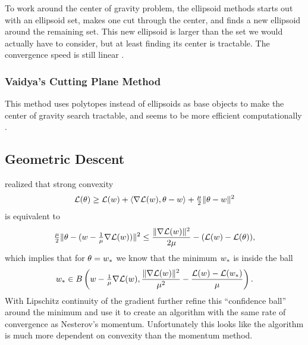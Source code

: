 To work around the center of gravity problem, the ellipsoid methods starts out
with an ellipsoid set, makes one cut through the center, and finds a new
ellipsoid around the remaining set. This new ellipsoid is larger than the
set we would actually have to consider, but at least finding its center is
tractable. The convergence speed is still linear \parencite[e.g][Theorem
2.4]{bubeckConvexOptimizationAlgorithms2015}.


\subsubsection{Vaidya's Cutting Plane Method}

This method uses polytopes instead of ellipsoids as base objects to make the
center of gravity search tractable, and seems to be more efficient
computationally \parencite[e.g.][Section
2.3]{bubeckConvexOptimizationAlgorithms2015}.

\subsection{Geometric Descent}

\textcite{bubeckGeometricAlternativeNesterov2015} realized that strong convexity
\begin{align*}
	\mathcal{L}(\theta)
	\ge \mathcal{L}(w) + \langle \nabla\mathcal{L}(w), \theta-w\rangle
	+ \tfrac{\mu}{2}\|\theta-w\|^2
\end{align*}
is equivalent to
\begin{align*}
	\tfrac{\mu}{2}\|\theta - (w - \tfrac1{\mu} \nabla\mathcal{L}(w))\|^2
	\le \frac{\|\nabla\mathcal{L}(w)\|^2}{2\mu} - (\mathcal{L}(w)-\mathcal{L}(\theta)),
\end{align*}
which implies that for \(\theta=w_*\) we know that the minimum
\(w_*\) is inside the ball
\begin{align*}
	w_*\in B\left(w- \tfrac1{\mu}\nabla\mathcal{L}(w), 
		\frac{\|\nabla\mathcal{L}(w)\|^2}{\mu^2}
		- \frac{ \mathcal{L}(w)-\mathcal{L}(w_*) }{\mu}
	\right).
\end{align*}
With Lipschitz continuity of the gradient \textcite{bubeckGeometricAlternativeNesterov2015}
further refine this ``confidence ball'' around the minimum and use it to create
an algorithm with the same rate of convergence as Nesterov's momentum.
Unfortunately this looks like the algorithm is much more dependent on
convexity than the momentum method.

